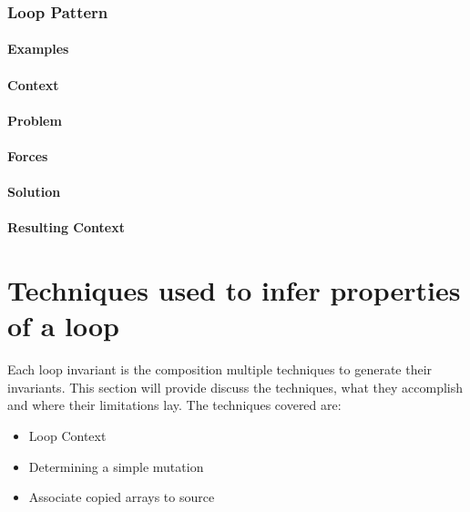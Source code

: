 \subsubsection{Loop Pattern}

\paragraph{Examples}
\paragraph{Context}
\paragraph{Problem}
\paragraph{Forces}
\paragraph{Solution}
\paragraph{Resulting Context}

\section{Techniques used to infer properties of a loop}

Each loop invariant is the composition multiple techniques to generate their
invariants. This section will provide discuss the techniques, what they
accomplish and where their limitations lay.
The techniques covered are:

\begin{itemize}
    \item{Loop Context}
    \item{Determining a simple mutation}
    \item{Associate copied arrays to source}
\end{itemize}

